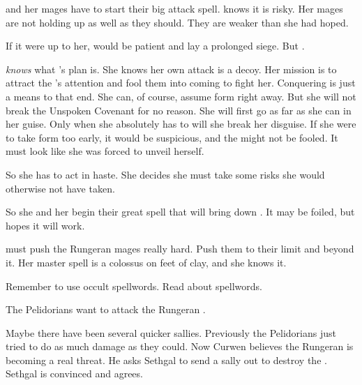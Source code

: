 \Takestsha and her mages have to start their big attack spell. 
\Takestsha knows it is risky. 
Her mages are not holding up as well as they should. 
They are weaker than she had hoped. 

If it were up to her, \Takestsha would be patient and lay a prolonged siege. 
But . 

\Takestsha \emph{knows} what \Secherdamon's plan is.
She knows her own attack is a decoy.
Her mission is to attract the \resphain's attention and fool them into coming to fight her. 
Conquering \Forclin is just a means to that end. 
She can, of course, assume \draconian form right away.
But she will not break the Unspoken Covenant for no reason.
She will first go as far as she can in her \human guise.
Only when she absolutely has to will she break her disguise.
If she were to take \draconian form too early, it would be suspicious, and the \resphain might not be fooled. 
It must look like she was forced to unveil herself. 

So she has to act in haste. 
She decides she must take some risks she would otherwise not have taken. 

So she and her \ishrah begin their great spell that will bring down \Forclin. 
It may be foiled, but \Takestsha hopes it will work. 

\Takestsha must push the Rungeran mages really hard. 
Push them to their limit and beyond it. 
Her master spell is a colossus on feet of clay, and she knows it. 

Remember to use occult spellwords.
Read about spellwords. 






\begin{comment}
  \section{Attack against the Ishrah}
\end{comment}
\new
The Pelidorians want to attack the Rungeran \ishrah. 

Maybe there have been several quicker sallies. 
Previously the Pelidorians just tried to do as much damage as they could. 
Now Curwen believes the Rungeran \ishrah is becoming a real threat. 
He asks Sethgal to send a sally out to destroy the \ishrah.
Sethgal is convinced and agrees. 

